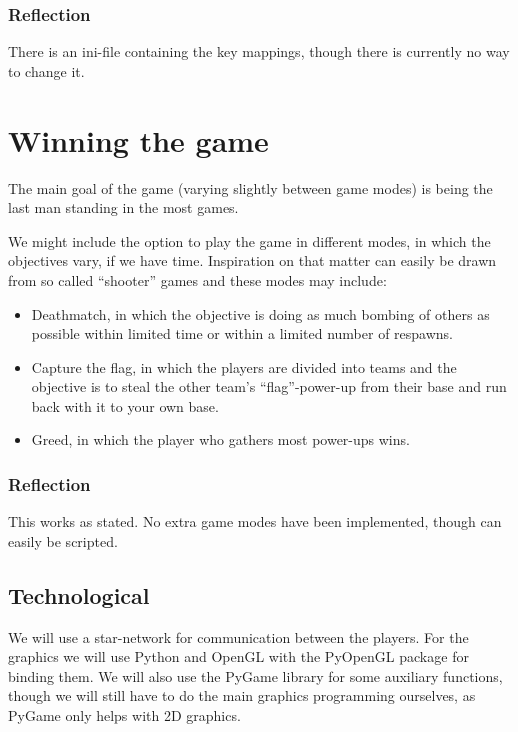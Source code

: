 \subsubsection{Reflection}
There is an ini-file containing the key mappings, though there is currently no way to change it.

\section{Winning the game}
The main goal of the game (varying slightly between game modes) is being the last man standing in the most games.

We might include the option to play the game in different modes, in which the objectives vary, if we have time. Inspiration on that matter can easily be drawn from so called ``shooter'' games and these modes may include:

\begin{itemize}
  \item Deathmatch, in which the objective is doing as much bombing of others as possible within limited time or within a limited number of respawns.

  \item Capture the flag, in which the players are divided into teams and the objective is to steal the other team's ``flag''-power-up from their base and run back with it to your own base.

  \item Greed, in which the player who gathers most power-ups wins.
\end{itemize}

\subsubsection{Reflection}
This works as stated. No extra game modes have been implemented, though can easily be scripted.

\subsection{Technological}

We will use a star-network for communication between the players. For the graphics we will use Python and OpenGL with the PyOpenGL package for binding them. We will also use the PyGame library for some auxiliary functions, though we will still have to do the main graphics programming ourselves, as PyGame only helps with 2D graphics.

